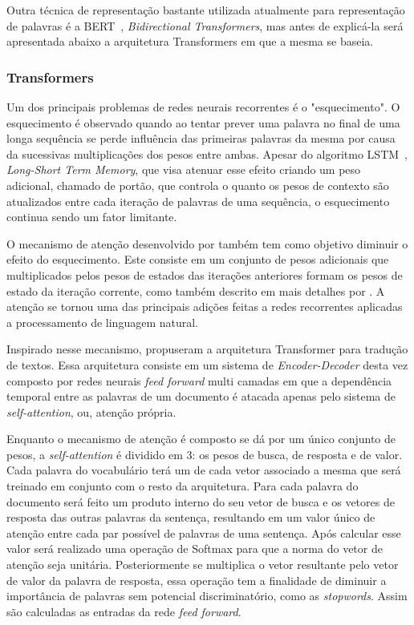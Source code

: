 Outra técnica de representação bastante utilizada atualmente para representação
de palavras é a BERT~\cite{devlin18}, \textit{Bidirectional Transformers}, mas
antes de explicá-la será apresentada abaixo a arquitetura Transformers em que a
mesma se baseia.

\subsubsection{Transformers}

Um dos principais problemas de redes neurais recorrentes é o "esquecimento".
O esquecimento é observado quando ao tentar prever uma palavra no final de uma
longa sequência se perde influência das primeiras palavras da mesma por causa da
sucessivas multiplicações dos pesos entre ambas.
Apesar do algoritmo LSTM~\cite{hochreiter97}, \textit{Long-Short Term Memory},
que visa atenuar esse efeito criando um peso adicional, chamado de portão, que
controla o quanto os pesos de contexto são atualizados entre cada iteração de
palavras de uma sequência, o esquecimento continua sendo um fator limitante.

O mecanismo de atenção desenvolvido por \citet{bahdanau14} também tem como
objetivo diminuir o efeito do esquecimento.
Este consiste em um conjunto de pesos adicionais que multiplicados pelos pesos
de estados das iterações anteriores formam os pesos de estado da iteração
corrente, como também descrito em mais detalhes por \citet{luong15}.
A atenção se tornou uma das principais adições feitas a redes recorrentes
aplicadas a processamento de linguagem natural.

Inspirado nesse mecanismo, \citet{vaswani17} propuseram a arquitetura
Transformer para tradução de textos.
Essa arquitetura consiste em um sistema de \textit{Encoder-Decoder} desta vez
composto por redes neurais \textit{feed forward} multi camadas em que a
dependência temporal entre as palavras de um documento é atacada apenas pelo
sistema de \textit{self-attention}, ou, atenção própria.

Enquanto o mecanismo de atenção é composto se dá por um único conjunto de pesos,
a \textit{self-attention} é dividido em 3: os pesos de busca, de resposta e de
valor.
Cada palavra do vocabulário terá um de cada vetor associado a mesma que será
treinado em conjunto com o resto da arquitetura.
Para cada palavra do documento será feito um produto interno do seu vetor de
busca e os vetores de resposta das outras palavras da sentença, resultando em um
valor único de atenção entre cada par possível de palavras de uma sentença.
Após calcular esse valor será realizado uma operação de Softmax para que a norma
do vetor de atenção seja unitária.
Posteriormente se multiplica o vetor resultante pelo vetor de valor da palavra
de resposta, essa operação tem a finalidade de diminuir a importância de
palavras sem potencial discriminatório, como as \textit{stopwords}.
Assim são calculadas as entradas da rede \textit{feed forward}.

